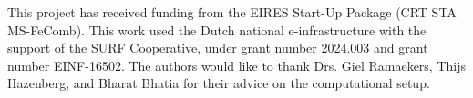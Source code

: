\documentclass[twocolumn,9pt]{article} %
\begin{document}
This project has received funding from the EIRES Start-Up Package (CRT STA MS-FeComb). This work used the Dutch national e-infrastructure with the support of the SURF Cooperative, under grant number 2024.003 and grant number EINF-16502. The authors would like to thank Drs. Giel Ramaekers, Thijs Hazenberg, and Bharat Bhatia for their advice on the computational setup.




\footnotesize
\baselineskip 9pt

\clearpage
\thispagestyle{empty}




\newpage

\small
\baselineskip 10pt

\end{document}
